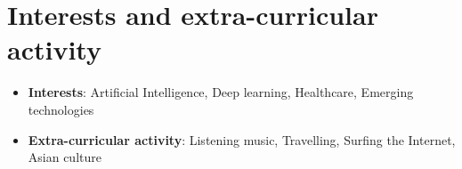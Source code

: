 \documentclass[10pt,a4paper,sans]{moderncv}
\begin{document}
	\section{Interests and extra-curricular activity}
		\begin{itemize}
			\vspace{7pt}
			\item \textbf{Interests}: Artificial Intelligence, Deep learning, Healthcare, Emerging technologies
			\vspace{4pt}
			\item \textbf{Extra-curricular activity}: Listening music, Travelling, Surfing the Internet, Asian culture
		\end{itemize}
	
	
	\clearpage
\end{document}
